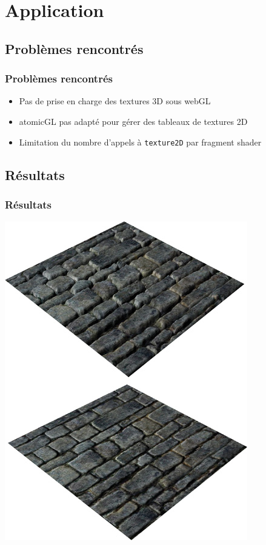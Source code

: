\documentclass{beamer}
\begin{document}
\section{Application}
\subsection{Problèmes rencontrés}
\begin{frame}
    \frametitle{Problèmes rencontrés}
    \begin{itemize}
        \item Pas de prise en charge des textures 3D sous webGL
        \item atomicGL pas adapté pour gérer des tableaux de textures 2D
        \item Limitation du nombre d'appels à \texttt{texture2D} par fragment shader
    \end{itemize}
\end{frame}
\subsection{Résultats}
\begin{frame}
    \frametitle{Résultats}
    \centering
    \includegraphics[scale=0.5]{images/displaced_stone}
\end{frame}
\end{document}
